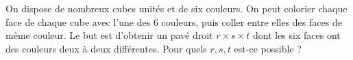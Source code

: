 On dispose de nombreux cubes unités et de six couleurs. On peut colorier chaque face de chaque cube avec l'une des $6$ couleurs, puis coller entre elles des faces de même couleur. Le but est d'obtenir un pavé droit $r \times s \times t$ dont les six faces ont des couleurs deux à deux différentes. Pour quels $r, s, t$ est-ce possible ?
